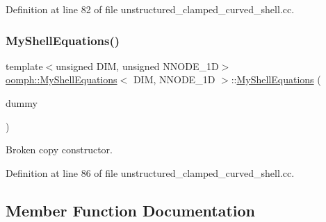 Definition at line 82 of file unstructured\+\_\+clamped\+\_\+curved\+\_\+shell.\+cc.

\mbox{\label{classoomph_1_1MyShellEquations_af92d9d503350b3c84d309b1e70911e27}} 
\subsubsection{\texorpdfstring{My\+Shell\+Equations()}{MyShellEquations()}\hspace{0.1cm}{\footnotesize\ttfamily [2/2]}}
{\footnotesize\ttfamily template$<$unsigned D\+IM, unsigned N\+N\+O\+D\+E\+\_\+1D$>$ \\
\hyperlink{classoomph_1_1MyShellEquations}{oomph\+::\+My\+Shell\+Equations}$<$ D\+IM, N\+N\+O\+D\+E\+\_\+1D $>$\+::\hyperlink{classoomph_1_1MyShellEquations}{My\+Shell\+Equations} (\begin{DoxyParamCaption}\item[{const \hyperlink{classoomph_1_1MyShellEquations}{My\+Shell\+Equations}$<$ D\+IM, N\+N\+O\+D\+E\+\_\+1D $>$ \&}]{dummy }\end{DoxyParamCaption})\hspace{0.3cm}{\ttfamily [inline]}}



Broken copy constructor. 



Definition at line 86 of file unstructured\+\_\+clamped\+\_\+curved\+\_\+shell.\+cc.



\subsection{Member Function Documentation}
\mbox{\label{classoomph_1_1MyShellEquations_a72cb38c977990a46780dfedab0fee8b8}} 
